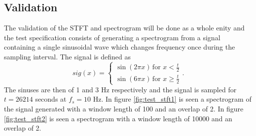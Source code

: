 \subsection{Validation}
The validation of the STFT and spectrogram will be done as a whole enity and the test specification consists of generating a spectrogram from a signal containing a single sinusoidal wave which changes frequency once during the sampling interval. The signal is defined as
\begin{equation}
sig(x)=\begin{cases}\sin(2\pi x)\,\text{for }x<\frac{t}{2}\\
\sin(6\pi x)\,\text{for }x\geq\frac{t}{2}
\end{cases}.
\end{equation}
The sinuses are then of 1 and 3 Hz respectively and the signal is sampled for $t=26214$ seconds at $f_s=10$ Hz. In figure \ref{fig:test_stft1} is seen a spectrogram of the signal generated with a window length of 100 and an overlap of 2. In figure \ref{fig:test_stft2} is seen a spectrogram with a window length of 10000 and an overlap of 2.
